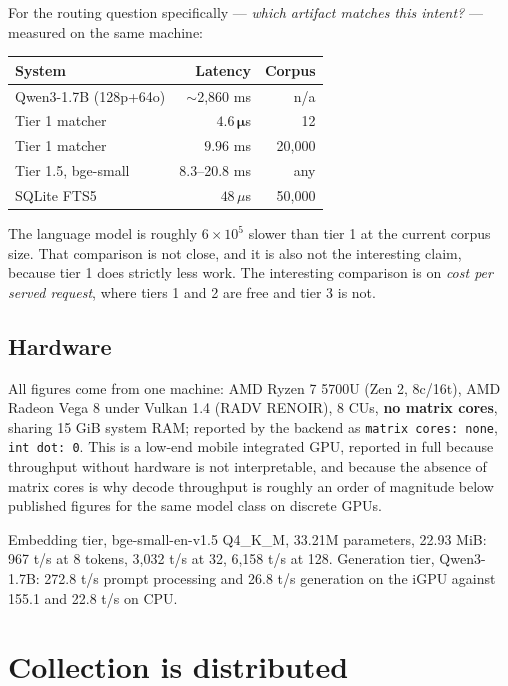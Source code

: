 \documentclass[11pt,twocolumn]{article}
\begin{document}
For the routing question specifically --- \emph{which artifact matches this
intent?} --- measured on the same machine:

\begin{center}
\small
\begin{tabular}{@{}lrr@{}}
\toprule
\textbf{System} & \textbf{Latency} & \textbf{Corpus} \\
\midrule
Qwen3-1.7B (128p+64o) & $\sim$2{,}860 ms & n/a \\
Tier 1 matcher & $\mathbf{4.6\,\mu}$s & 12 \\
Tier 1 matcher & $\mathbf{9.96}$ ms & 20{,}000 \\
Tier 1.5, bge-small & 8.3--20.8 ms & any \\
SQLite FTS5 & $48\,\mu$s & 50{,}000 \\
\bottomrule
\end{tabular}
\normalsize
\end{center}

The language model is roughly $6\times10^{5}$ slower than tier 1 at the current
corpus size. That comparison is not close, and it is also not the interesting
claim, because tier 1 does strictly less work. The interesting comparison is on
\emph{cost per served request}, where tiers 1 and 2 are free and tier 3 is not.

\subsection{Hardware}

All figures come from one machine: AMD Ryzen 7 5700U (Zen 2, 8c/16t), AMD Radeon
Vega 8 under Vulkan 1.4 (RADV RENOIR), 8 CUs, \textbf{no matrix cores}, sharing
15 GiB system RAM; reported by the backend as \texttt{matrix cores: none},
\texttt{int dot: 0}. This is a low-end mobile integrated GPU, reported in full
because throughput without hardware is not interpretable, and because the
absence of matrix cores is why decode throughput is roughly an order of
magnitude below published figures for the same model class on discrete GPUs.

Embedding tier, bge-small-en-v1.5 Q4\_K\_M, 33.21M parameters, 22.93 MiB:
967 t/s at 8 tokens, 3{,}032 t/s at 32, 6{,}158 t/s at 128. Generation tier,
Qwen3-1.7B: 272.8 t/s prompt processing and 26.8 t/s generation on the iGPU
against 155.1 and 22.8 t/s on CPU.

\section{Collection is distributed}
\end{document}
